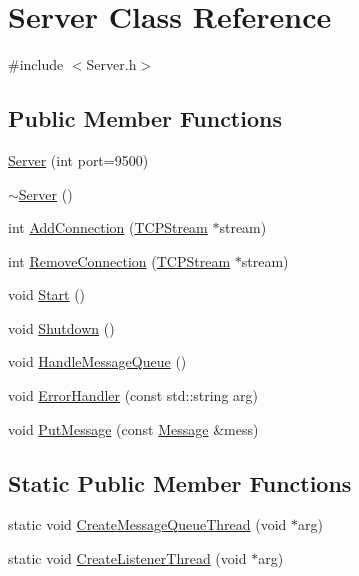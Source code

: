 \hypertarget{class_server}{}\section{Server Class Reference}
\label{class_server}


{\ttfamily \#include $<$Server.\+h$>$}

\subsection*{Public Member Functions}
\begin{DoxyCompactItemize}
\item 
\hyperlink{class_server_a4657bcf0d9581bbfa0c9b2acd043a346}{Server} (int port=9500)
\item 
\hyperlink{class_server_a4b3aa2579cb1c8cd1d069582c14d0fa6}{$\sim$\+Server} ()
\item 
int \hyperlink{class_server_a2090e5239076aa11734d768d99951c00}{Add\+Connection} (\hyperlink{class_t_c_p_stream}{T\+C\+P\+Stream} $\ast$stream)
\item 
int \hyperlink{class_server_a15a94eaa4ca5be5db9a65173b6532257}{Remove\+Connection} (\hyperlink{class_t_c_p_stream}{T\+C\+P\+Stream} $\ast$stream)
\item 
void \hyperlink{class_server_acaea883b722927c7d8299a74447c8d1b}{Start} ()
\item 
void \hyperlink{class_server_a244a84a1e412dd7954ae874456536b39}{Shutdown} ()
\item 
void \hyperlink{class_server_a5a1df33cb73f1b66e986ef477fe8c530}{Handle\+Message\+Queue} ()
\item 
void \hyperlink{class_server_aeb68e272f180a531cb98eb0c6d5db368}{Error\+Handler} (const std\+::string arg)
\item 
void \hyperlink{class_server_a8a0f5d1fcef3492463905f813b699574}{Put\+Message} (const \hyperlink{class_message}{Message} \&mess)
\end{DoxyCompactItemize}
\subsection*{Static Public Member Functions}
\begin{DoxyCompactItemize}
\item 
static void \hyperlink{class_server_a460b55499056f7572fc854a2fa0cf4a7}{Create\+Message\+Queue\+Thread} (void $\ast$arg)
\item 
static void \hyperlink{class_server_a5941f455c15a223cda5ab5f69fa79cf2}{Create\+Listener\+Thread} (void $\ast$arg)
\end{DoxyCompactItemize}


